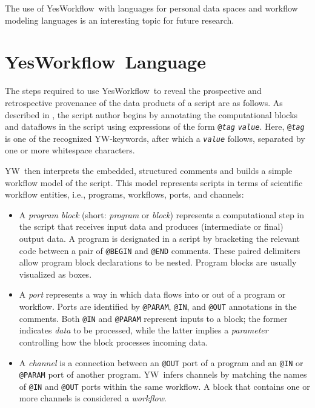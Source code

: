 \documentclass[nocopyrightspace]{sigplanconf}
\newcommand{\YW}{\textsf{YesWorkflow}}
\newcommand{\yw}{\textsf{YW}}
\newcommand{\ywa}[1]{\texttt{#1}}
\begin{document}
The use of \YW\ with languages for personal data spaces
\cite{vaz2007itrails,hedeler2009dimensions} and workflow modeling
languages \cite{bowers2012scientific,amstutz15CDL,frazer15WDL} is an
interesting topic for future research.


\section{\YW\ Language}
\label{sec:yesworkflow}


The steps required to use \YW\ to reveal the prospective and
retrospective provenance of the data products of a script are as
follows.  As described in \cite{mcphillips2015ywIJDC}, the script
author begins by annotating the computational blocks and dataflows in
the script using expressions of the form
\ywa{@\emph{tag}}\,\textvisiblespace\,\ywa{\emph{value}}. Here,
\ywa{@\emph{tag}} is one of the recognized \yw-keywords, after which a
\ywa{\emph{value}} follows, separated by one or more whitespace
characters.

\yw\ then interprets the embedded, structured comments and builds a
simple workflow model of the script. This model represents scripts in
terms of scientific workflow entities, i.e., programs, workflows,
ports, and channels:

\begin{itemize}
\item A \emph{program block} (short: \emph{program} or \emph{block})
  represents a computational step in the script that receives input
  data and produces (intermediate or final) output data. A program is
  designated in a script by bracketing the relevant code between a
  pair of \ywa{@BEGIN} and \ywa{@END} comments. These paired
  delimiters allow program block declarations to be nested. Program blocks are
  usually visualized as boxes. 
\item A \emph{port} represents a way in which data flows into or out
  of a program or workflow. Ports are identified by \ywa{@PARAM},
  \ywa{@IN}, and \ywa{@OUT} annotations in the comments.  Both
  \ywa{@IN} and \ywa{@PARAM} represent inputs to a block; the former
  indicates \emph{data} to be processed, while the latter implies a
  \emph{parameter} controlling how the block processes incoming data.
\item A \emph{channel} is a connection between an \ywa{@OUT} port of a
  program and an \ywa{@IN} or \ywa{@PARAM} port of another 
  program. \yw\ infers channels by matching the names of \ywa{@IN} and
  \ywa{@OUT} ports within the same workflow.  A block that contains
  one or more channels is considered a \emph{workflow}.
\end{itemize}
\end{document}

